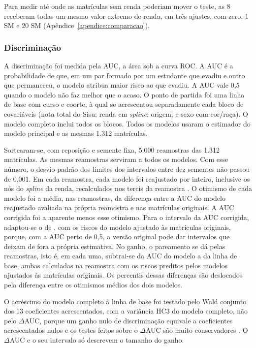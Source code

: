 \documentclass[12pt,a4paper]{article}
\begin{document}
Para medir até onde as matrículas sem renda poderiam mover o teste, as 8 receberam todas um mesmo valor extremo de renda, em três ajustes, com zero, 1 SM e 20 SM (Apêndice~\ref{apendice:comparacao}).

\subsubsection{Discriminação}
\label{sec:discriminacao}

A discriminação foi medida pela AUC, a área sob a curva ROC. A AUC é a probabilidade de que, em um par formado por um estudante que evadiu e outro que permaneceu, o modelo atribua maior risco ao que evadiu. A AUC vale 0,5 quando o modelo não faz melhor que o acaso. O ponto de partida foi uma linha de base com curso e coorte, à qual se acrescentou separadamente cada bloco de covariáveis (nota total do Sisu; renda em \textit{spline}; origem; e sexo com cor/raça). O modelo completo inclui todos os blocos. Todos os modelos usaram o estimador do modelo principal e as mesmas 1.312 matrículas.

Sortearam-se, com reposição e semente fixa, 5.000 reamostras das 1.312 matrículas. As mesmas reamostras serviram a todos os modelos. Com esse número, o desvio-padrão dos limites dos intervalos entre dez sementes não passou de 0,001. Em cada reamostra, cada modelo foi reajustado por inteiro, inclusive os nós do \textit{spline} da renda, recalculados nos tercis da reamostra \citep[p.~375]{harrell1996multivariable}. O otimismo de cada modelo foi a média, nas reamostras, da diferença entre a AUC do modelo reajustado avaliada na própria reamostra e nas matrículas originais. A AUC corrigida foi a aparente menos esse otimismo. Para o intervalo da AUC corrigida, adaptou-se o de \citet{noma2021confidence}, com os riscos do modelo ajustado às matrículas originais, porque, com a AUC perto de 0,5, a versão original pode dar intervalos que deixam de fora a própria estimativa. No ganho, o pareamento se dá pelas reamostras, isto é, em cada uma, subtrai-se da AUC do modelo a da linha de base, ambas calculadas na reamostra com os riscos preditos pelos modelos ajustados às matrículas originais. Os percentis dessas diferenças são deslocados pela diferença entre os otimismos médios dos dois modelos.

O acréscimo do modelo completo à linha de base foi testado pelo Wald conjunto dos 13 coeficientes acrescentados, com a variância HC3 do modelo completo, não pelo $\Delta$AUC, porque um ganho nulo de discriminação equivale a coeficientes acrescentados nulos e os testes feitos sobre o $\Delta$AUC são muito conservadores \citep{pepe2013testing}. O $\Delta$AUC e o seu intervalo só descrevem o tamanho do ganho.
\end{document}
